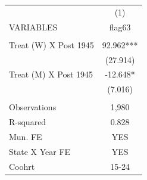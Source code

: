 \begin{tabular}{lc} \hline
 & (1) \\
VARIABLES & flag63 \\ \hline
 &  \\
Treat (W) X Post 1945 & 92.962*** \\
 & (27.914) \\
Treat (M) X Post 1945 & -12.648* \\
 & (7.016) \\
 &  \\
Observations & 1,980 \\
R-squared & 0.828 \\
Mun. FE & YES \\
State X Year FE & YES \\
 Coohrt & 15-24 \\ \hline
\end{tabular}
